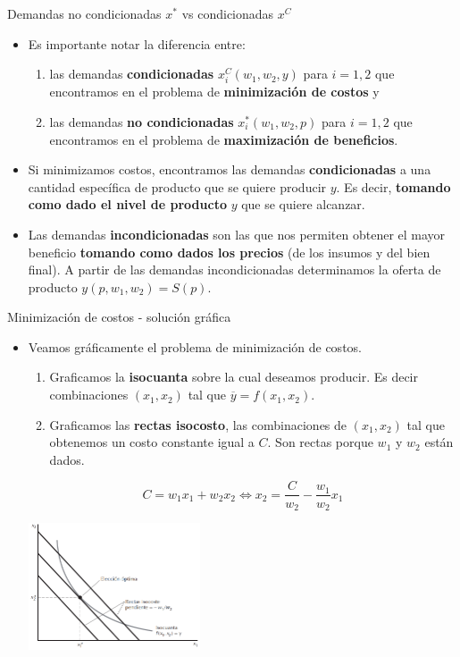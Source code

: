 \documentclass{beamer}
\theoremstyle{definition}
\begin{document}
\begin{frame}{Demandas no condicionadas $x^*$ vs condicionadas $x^C$}
\begin{itemize}
\item Es importante notar la diferencia entre: 
\begin{enumerate}
    \item las demandas \textbf{condicionadas} $x_i^C(w_1,w_2,y)$ para $i=1,2$ que encontramos en el problema de \textbf{minimización de costos} y 
    \item las demandas \textbf{no condicionadas} $x_i^*(w_1,w_2,p)$ para $i=1,2$ que encontramos en el problema de \textbf{maximización de beneficios}.
\end{enumerate} 
\item Si minimizamos costos, encontramos las demandas \textbf{condicionadas} a una cantidad específica de producto que se quiere producir $y$. Es decir, \textbf{tomando como dado el nivel de producto} $y$ que se quiere alcanzar. 
\item Las demandas \textbf{incondicionadas} son las
que nos permiten obtener el mayor beneficio \textbf{tomando como dados los precios} (de los insumos y del bien final). A partir de las demandas incondicionadas determinamos la oferta de producto $y(p,w_1,w_2)=S(p)$.
\end{itemize}
\end{frame}	

\begin{frame}{Minimización de costos - solución gráfica}
\begin{itemize}
\item Veamos gr\'{a}ficamente el problema de minimización de costos. 

\begin{enumerate}
    \item \small{Graficamos la \textbf{isocuanta} sobre la cual deseamos producir. Es decir combinaciones} $\left( x_{1},x_{2}\right)$ \small{tal que} $\overline{y}=f(x_{1},x_{2})$.
    \item Graficamos las \textbf{rectas isocosto}, \small{las combinaciones de} $\left( x_{1},x_{2}\right)$ \small{tal que obtenemos un costo constante igual a} $C$. Son rectas porque $w_1$ y $w_2$ están dados.
\end{enumerate} 
\[C =w_{1}x_{1}+w_{2}x_{2} \Leftrightarrow x_{2} =\frac{C}{w_{2}}-\frac{w_{1}}{w_{2}}x_1\]\par
	\begin{center}
\includegraphics[width=2in]{figures4/isocost.png}
\end{center}
\end{itemize}
\end{frame}		
\end{document}
